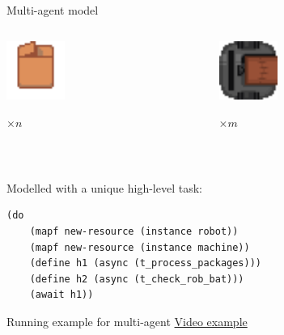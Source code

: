 \begin{frame}[fragile]{Multi-agent model}
    \begin{columns}
        \begin{column}{0.5\textwidth}
            \centering
            \includegraphics[width = 0.3\textwidth]{images/godot/package.png}
            
            \Large $\times n$
        \end{column}
        \begin{column}{0.5\textwidth}
            \centering
            \includegraphics[width = 0.3\textwidth]{images/godot/robot_texture.png}
            
            \LARGE $\times m$
        \end{column}
    \end{columns}

~~

        Modelled with a unique high-level task:
        \setlength{\leftmargini}{0pt}
        \lstset{columns=fullflexible}
        \small
    \begin{lstlisting}
(do
    (mapf new-resource (instance robot))
    (mapf new-resource (instance machine))
    (define h1 (async (t_process_packages)))
    (define h2 (async (t_check_rob_bat)))
    (await h1))
    \end{lstlisting}    
\end{frame}

\begin{frame}{Running example for multi-agent}
    \centering
    \LARGE
    \href{https://youtu.be/KqBnKKIjug4}{Video example}
\end{frame}


